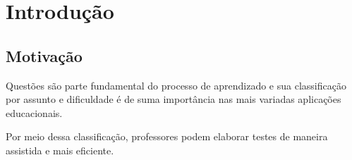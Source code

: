%
%
% 
%

\chapter{Introdução}
\noindent

\section{Motivação}
Questões são parte fundamental do processo de aprendizado e sua classificação por assunto e dificuldade é de suma importância nas mais variadas aplicações educacionais.

Por meio dessa classificação, professores podem elaborar testes de maneira assistida e mais eficiente.

